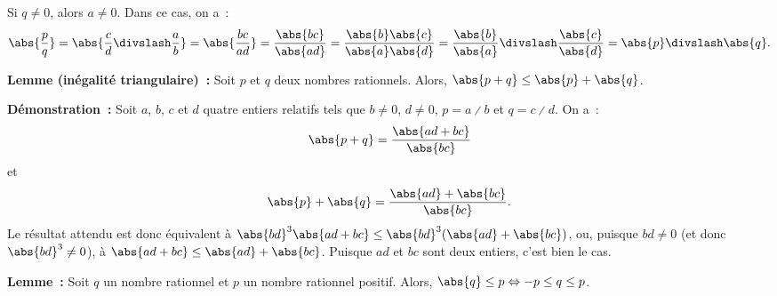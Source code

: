     Si $q \neq 0$, alors $a \neq 0$. 
    Dans ce cas, on a :
    \begin{equation*}
        \abs{\frac{p}{q}} 
        = \abs{\frac{c}{d} \divslash \frac{a}{b}}
        = \abs{\frac{b c}{a d}}
        = \frac{\abs{b c}}{\abs{a d}}
        = \frac{\abs{b} \abs{c}}{\abs{a} \abs{d}}
        = \frac{\abs{b}}{\abs{a}} \divslash \frac{\abs{c}}{\abs{d}}
        = \abs{p} \divslash \abs{q} .
    \end{equation*}
    
    \done

\medskip

\noindent\textbf{Lemme (inégalité triangulaire) :} Soit $p$ et $q$ deux nombres rationnels. 
    Alors, $\abs{p + q} \leq \abs{p} + \abs{q}$.

\medskip

\noindent\textbf{Démonstration :} 
    Soit $a$, $b$, $c$ et $d$ quatre entiers relatifs tels que $b \neq 0$, $d \neq 0$, $p = a \divslash b$ et $q = c \divslash d$.
    On a : 
    \begin{equation*}
        \abs{p + q} = \frac{\abs{a d + b c}}{\abs{b c}}
    \end{equation*}
    et 
    \begin{equation*}
        \abs{p} + \abs{q} = \frac{\abs{a d} + \abs{b c}}{\abs{b c}} .
    \end{equation*}
    Le résultat attendu est donc équivalent à $\abs{b d}^3 \abs{a d + b c} \leq \abs{b d}^3 (\abs{a d} + \abs{b c})$, ou, puisque $b d \neq 0$ (et donc $\abs{b d}^3 \neq 0$), à $ \abs{a d + b c} \leq \abs{a d} + \abs{b c}$. 
    Puisque $a d$ et $b c$ sont deux entiers, c'est bien le cas.

    \done

\medskip

\noindent\textbf{Lemme :} Soit $q$ un nombre rationnel et $p$ un nombre rationnel positif. 
    Alors, $\abs{q} \leq p \Leftrightarrow -p \leq q \leq p$.

\medskip

